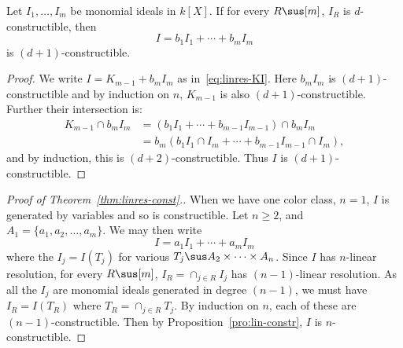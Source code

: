 \begin{prop} \label{pro:lin-constr}
  Let $I_1, \ldots, I_m$ be monomial ideals in $k[X]$. If for every
  $R \sus [m]$, $I_R$ is $d$-constructible, then
  \[ I = b_1 I_1 + \cdots + b_m I_m \]
  is $(d+1)$-constructible.
\end{prop}

\begin{proof}
  We write $I = K_{m-1} + b_mI_m$ as in~\eqref{eq:linres-KI}.
  Here $b_m I_m$ is $(d+1)$-constructible
  and by induction on $n$, $K_{m-1}$ is also $(d+1)$-constructible.
  Further their intersection is:
  \begin{align*}  K_{m-1} \cap b_mI_m
    & = (b_1I_1 + \cdots + b_{m-1}I_{m-1}) \cap b_m I_m \\
    & = b_m(b_1I_1 \cap I_m + \cdots + b_{m-1} I_{m-1} \cap I_m),
\end{align*}
  and by induction, this is $(d+2)$-constructible.
  Thus $I$ is $(d+1)$-constructible.
\end{proof}

\begin{proof}[Proof of Theorem~\ref{thm:linres-const}.]
  When we have one color class,  $n = 1$, $I$ is generated by variables and
  so is constructible. Let $n \geq 2$, and $A_1 = \{a_1, a_2, \ldots, a_m \}$.
   We may then write
  \[ I = a_1I_1 + \cdots + a_m I_m \] where the $I_j = I(T_j)$ for
  various $T_j \sus A_2 \times \cdots \times A_n$. Since $I$ has $n$-linear
  resolution, for every $R \sus [m]$, $I_R = \cap_{j \in R} I_j$ has
  $(n-1)$-linear resolution. As all the $I_j$ are monomial ideals
  generated in degree $(n-1)$, we must have $I_R = I(T_R)$ where
  $T_R = \cap_{j \in R} T_j$. By induction on $n$, each of these are
  $(n-1)$-constructible. Then by Proposition~\ref{pro:lin-constr}, $I$ is
  $n$-constructible.
\end{proof}

